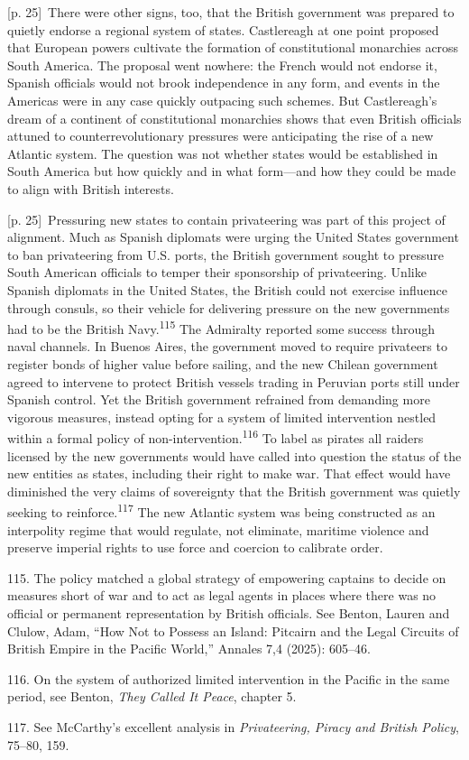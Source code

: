 \documentclass[10pt,a4paper]{article}
\begin{document}
{\scriptsize\color{gray} [p. 25]}\ There were other signs, too, that the British government was prepared to quietly endorse a regional system of states. Castlereagh at one point proposed that European powers cultivate the formation of constitutional monarchies across South America. The proposal went nowhere: the French would not endorse it, Spanish officials would not brook independence in any form, and events in the Americas were in any case quickly outpacing such schemes. But Castlereagh’s dream of a continent of constitutional monarchies shows that even British officials attuned to counterrevolutionary pressures were anticipating the rise of a new Atlantic system. The question was not whether states would be established in South America but how quickly and in what form—and how they could be made to align with British interests.\par
{\scriptsize\color{gray} [p. 25]}\ Pressuring new states to contain privateering was part of this project of alignment. Much as Spanish diplomats were urging the United States government to ban privateering from U.S. ports, the British government sought to pressure South American officials to temper their sponsorship of privateering. Unlike Spanish diplomats in the United States, the British could not exercise influence through consuls, so their vehicle for delivering pressure on the new governments had to be the British Navy.\nobreak\textsuperscript{115} The Admiralty reported some success through naval channels. In Buenos Aires, the government moved to require privateers to register bonds of higher value before sailing, and the new Chilean government agreed to intervene to protect British vessels trading in Peruvian ports still under Spanish control. Yet the British government refrained from demanding more vigorous measures, instead opting for a system of limited intervention nestled within a formal policy of non-intervention.\nobreak\textsuperscript{116} To label as pirates all raiders licensed by the new governments would have called into question the status of the new entities as states, including their right to make war. That effect would have diminished the very claims of sovereignty that the British government was quietly seeking to reinforce.\nobreak\textsuperscript{117} The new Atlantic system was being constructed as an interpolity regime that would regulate, not eliminate, maritime violence and preserve imperial rights to use force and coercion to calibrate order.\par{\small 115. The policy matched a global strategy of empowering captains to decide on measures short of war and to act as legal agents in places where there was no official or permanent representation by British officials. See Benton, Lauren and Clulow, Adam, “How Not to Possess an Island: Pitcairn and the Legal Circuits of British Empire in the Pacific World,” Annales 7,4 (2025): 605–46.\par}{\small 116. On the system of authorized limited intervention in the Pacific in the same period, see Benton, \textit{They Called It Peace}, chapter 5.\par}{\small 117. See McCarthy’s excellent analysis in \textit{Privateering, Piracy and British Policy}, 75–80, 159.\par}
\end{document}

